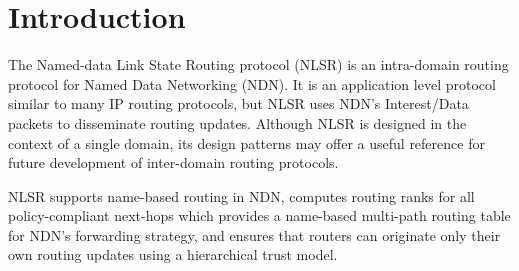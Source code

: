\section{Introduction}
\label{sec:intro}

The Named-data Link State Routing protocol (NLSR) is an intra-domain routing protocol for Named Data Networking (NDN).
It is an application level protocol similar to many IP routing protocols, but NLSR uses NDN's Interest/Data packets to disseminate routing updates.
Although NLSR is designed in the context of a single domain, its design patterns may offer a useful reference for future development of inter-domain routing protocols.

NLSR supports name-based routing in NDN, computes routing ranks for all policy-compliant next-hops which provides a name-based multi-path routing table for NDN's forwarding strategy,
and ensures that routers can originate only their own routing updates using a hierarchical trust model.

